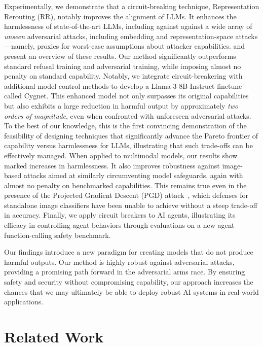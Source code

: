 Experimentally, we demonstrate that a circuit-breaking technique, Representation Rerouting (RR), notably improves the alignment of LLMs. It enhances the harmlessness of state-of-the-art LLMs, including against against a wide array of \emph{unseen} adversarial attacks, including embedding and representation-space attacks---namely, proxies for worst-case assumptions about attacker capabilities.  and  present an overview of these results. Our method significantly outperforms standard refusal training and adversarial training, while imposing almost no penalty on standard capability. Notably, we integrate circuit-breakering with additional model control methods to develop a Llama-3-8B-Instruct finetune called Cygnet. This enhanced model not only surpasses its original capabilities but also exhibits a large reduction in harmful output by approximately \emph{two orders of magnitude}, even when confronted with unforeseen adversarial attacks. To the best of our knowledge, this is the first convincing demonstration of the feasibility of designing techniques that significantly advance the Pareto frontier of capability versus harmlessness for LLMs, illustrating that such trade-offs can be effectively managed. When applied to multimodal models, our results show marked increases in harmlessness. It also improves robustness against image-based attacks aimed at similarly circumventing model safeguards, again with almost no penalty on benchmarked capabilities. This remains true even in the presence of the Projected Gradient Descent (PGD) attack~\citep{madry2017towards}, which defenses for standalone image classifiers have been unable to achieve without a steep trade-off in accuracy. Finally, we apply circuit breakers to AI agents, illustrating its efficacy in controlling agent behaviors through evaluations on a new agent function-calling safety benchmark.

Our findings introduce a new paradigm for creating models that do not produce harmful outputs. Our method is highly robust against adversarial attacks, providing a promising path forward in the adversarial arms race. By ensuring safety and security without compromising capability, our approach increases the chances that we may ultimately be able to deploy robust AI systems in real-world applications.

\section{Related Work}

